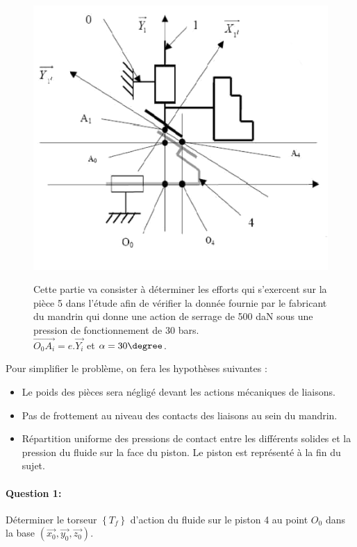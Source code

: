 \begin{figure}[!h]
  \begin{minipage}{0.48\linewidth}
  \centering\includegraphics[width=.9\linewidth]{img/mandrin_cin.png}
  \end{minipage}
  \hfill
  \begin{minipage}{0.48\linewidth}
Cette partie va consister à déterminer les efforts qui s'exercent sur la pièce 5 dans l'étude afin de vérifier la donnée fournie par le fabricant du mandrin qui donne une action de serrage de 500 daN sous une pression de fonctionnement de 30 bars. \\
$\overrightarrow{O_0A_i}=e.\overrightarrow{Y_i}$ et $\alpha=30\degree$.
 \end{minipage}
\end{figure}

Pour simplifier le problème, on fera les hypothèses suivantes : 
\begin{itemize}
 \item Le poids des pièces sera négligé devant les actions mécaniques de liaisons. 
 \item Pas de frottement au niveau des contacts des liaisons au sein du mandrin. 
 \item Répartition uniforme des pressions de contact entre les différents solides et la pression du fluide sur la face du piston. Le piston est représenté à la fin du sujet.
\end{itemize}

\paragraph{Question 1:} Déterminer le torseur $\left\{T_f\right\}$ d'action du fluide sur le piston 4 au point $O_0$ dans la base $(\overrightarrow{x_0},\overrightarrow{y_0},\overrightarrow{z_0})$.

